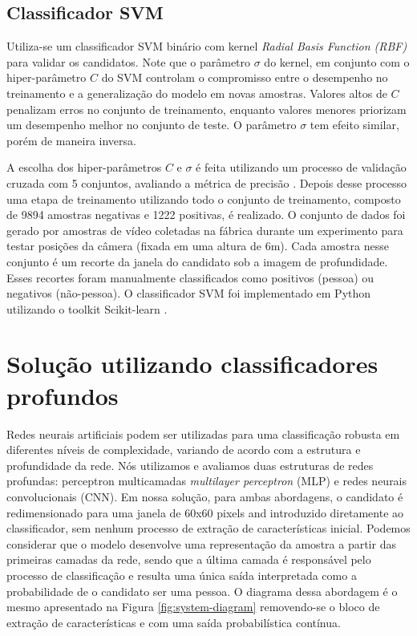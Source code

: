     \subsection{Classificador SVM}
      Utiliza-se um classificador SVM binário com kernel \textit{Radial Basis Function (RBF)} \cite{rbfkernel} para validar os candidatos. Note que o parâmetro $\sigma$ do kernel, em conjunto com o hiper-parâmetro $C$ do SVM controlam o compromisso entre o desempenho no treinamento e a generalização do modelo em novas amostras. Valores altos de $C$ penalizam erros no conjunto de treinamento, enquanto valores menores priorizam um desempenho melhor no conjunto de teste. O parâmetro $\sigma$ tem efeito similar, porém de maneira inversa.

      A escolha dos hiper-parâmetros $C$ e $\sigma$ é feita utilizando um processo de validação cruzada com 5 conjuntos, avaliando a métrica de precisão \cite{evaluationMetrics}. Depois desse processo uma etapa de treinamento utilizando todo o conjunto de treinamento, composto de 9894 amostras negativas e 1222 positivas, é realizado. O conjunto de dados foi gerado por amostras de vídeo coletadas na fábrica durante um experimento para testar posições da câmera (fixada em uma altura de 6m). Cada amostra nesse conjunto é um recorte da janela do candidato sob a imagem de profundidade. Esses recortes foram manualmente classificados como positivos (pessoa) ou negativos (não-pessoa). O classificador SVM foi implementado em Python utilizando o toolkit Scikit-learn \cite{scikit-learn}.


\section{Solução utilizando classificadores profundos}
\label{sec:deep}

    Redes neurais artificiais podem ser utilizadas para uma classificação robusta em diferentes níveis de complexidade, variando de acordo com a estrutura e profundidade da rede. Nós utilizamos e avaliamos duas estruturas de redes profundas: perceptron multicamadas \textit{multilayer perceptron} (MLP) e redes neurais convolucionais (CNN). Em nossa solução, para ambas abordagens, o candidato é redimensionado para uma janela de 60x60 pixels and introduzido diretamente ao classificador, sem nenhum processo de extração de características inicial. Podemos considerar que o modelo desenvolve uma representação da amostra a partir das primeiras camadas da rede, sendo que a última camada é responsável pelo processo de classificação e resulta uma única saída interpretada como a probabilidade de o candidato ser uma pessoa. O diagrama dessa abordagem é o mesmo apresentado na Figura \ref{fig:system-diagram} removendo-se o bloco de extração de características e com uma saída probabilística contínua.

